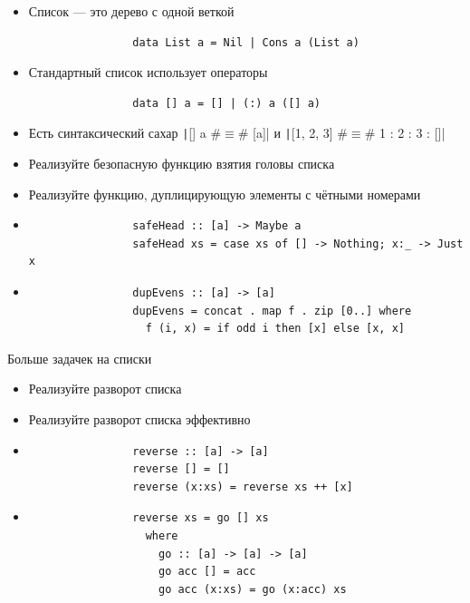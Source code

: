     \begin{frame}[fragile]{\secname}
        \begin{itemize}
            \item Список --- это дерево с одной веткой
            \begin{verbatim}
                data List a = Nil | Cons a (List a)
            \end{verbatim}
            \item Стандартный список использует операторы
            \begin{verbatim}
                data [] a = [] | (:) a ([] a)
            \end{verbatim}
            \item Есть синтаксический сахар \texttt|[] a #$\equiv$# [a]| и \texttt|[1, 2, 3] #$\equiv$# 1 : 2 : 3 : []|
            \item[\todo] Реализуйте безопасную функцию взятия головы списка
            \item[\todo] Реализуйте функцию, дуплицирующую элементы с чётными номерами
            \item[\answer] \pause
            \begin{verbatim}
                safeHead :: [a] -> Maybe a
                safeHead xs = case xs of [] -> Nothing; x:_ -> Just x
            \end{verbatim}
            \item[\answer] \pause
            \begin{verbatim}
                dupEvens :: [a] -> [a]
                dupEvens = concat . map f . zip [0..] where
                  f (i, x) = if odd i then [x] else [x, x]
            \end{verbatim}
        \end{itemize}
    \end{frame}

    \begin{frame}[fragile]{Больше задачек на списки}
        \begin{itemize}
            \item[\todo] Реализуйте разворот списка
            \item[\todo] Реализуйте разворот списка эффективно
            \item[\answer] \pause
            \begin{verbatim}
                reverse :: [a] -> [a]
                reverse [] = []
                reverse (x:xs) = reverse xs ++ [x]
            \end{verbatim}
            \item[\answer] \pause
            \begin{verbatim}
                reverse xs = go [] xs
                  where
                    go :: [a] -> [a] -> [a]
                    go acc [] = acc
                    go acc (x:xs) = go (x:acc) xs
            \end{verbatim}
        \end{itemize}
    \end{frame}

